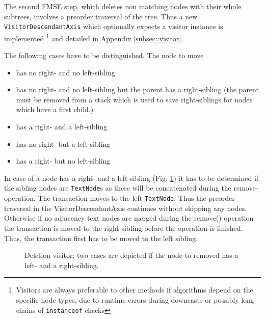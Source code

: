 The second FMSE step, which deletes non matching nodes with their whole subtrees, involves a preorder traversal of the tree. Thus a new \\\texttt{VisitorDescendantAxis} which optionally expects a visitor instance is implemented \footnote{Visitors are always preferable to other methods if algorithms depend on the specific node-types, due to runtime errors during downcasts or possibly long chains of \texttt{instanceof} checks} and detailed in Appendix \ref{subsec::visitor}. 

The following cases have to be distinguished. The node to move

\begin{itemize}
\item has no right- and no left-sibling
\item has no right- and no left-sibling but the parent has a right-sibling (the parent must be removed from a stack which is used to save right-siblings for nodes which have a first child.)
\item has a right- and a left-sibling
\item has no right- but a left-sibling
\item has a right- but no left-sibling
\end{itemize}

In case of a node has a right- and a left-sibling (Fig. \ref{fig:deletionvisitor}) it has to be determined if the sibling nodes are \texttt{TextNode}s as these will be concatenated during the remove-operation. The transaction moves to the left \texttt{TextNode}. Thus the preorder traversal in the VisitorDescendantAxis continues without skipping any nodes. Otherwise if no adjacency text nodes are merged during the remove()-operation the transaction is moved to the right-sibling before the operation is finished. Thus, the transaction first has to be moved to the left sibling.

\begin{figure}[tb]
\caption{\label{fig:deletionvisitor} Deletion visitor; two cases are depicted if the node to removed has a left- and a right-sibling.}
\end{figure} 

